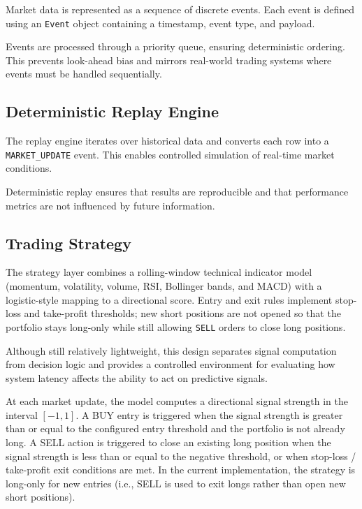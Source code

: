 \documentclass[12pt]{article}
\begin{document}
Market data is represented as a sequence of discrete events. Each event 
is defined using an \texttt{Event} object containing a timestamp, event 
type, and payload.

Events are processed through a priority queue, ensuring deterministic 
ordering. This prevents look-ahead bias and mirrors real-world trading 
systems where events must be handled sequentially.

\subsection{Deterministic Replay Engine}

The replay engine iterates over historical data and converts each row 
into a \texttt{MARKET\_UPDATE} event. This enables controlled simulation 
of real-time market conditions.

Deterministic replay ensures that results are reproducible and that 
performance metrics are not influenced by future information.

\subsection{Trading Strategy}

The strategy layer combines a rolling-window technical indicator model 
(momentum, volatility, volume, RSI, Bollinger bands, and MACD) with a 
logistic-style mapping to a directional score. Entry and exit rules 
implement stop-loss and take-profit thresholds; new short positions are 
not opened so that the portfolio stays long-only while still allowing 
\texttt{SELL} orders to close long positions.

Although still relatively lightweight, this design separates signal 
computation from decision logic and provides a controlled environment for 
evaluating how system latency affects the ability to act on predictive 
signals.

At each market update, the model computes a directional signal 
strength in the interval \([-1, 1]\). A BUY entry is triggered when the 
signal strength is greater than or equal to the configured entry threshold 
and the portfolio is not already long. A SELL action is triggered to close 
an existing long position when the signal strength is less than or equal to 
the negative threshold, or when stop-loss / take-profit exit conditions are 
met. In the current implementation, the strategy is long-only for new entries 
(i.e., SELL is used to exit longs rather than open new short positions).
\end{document}
